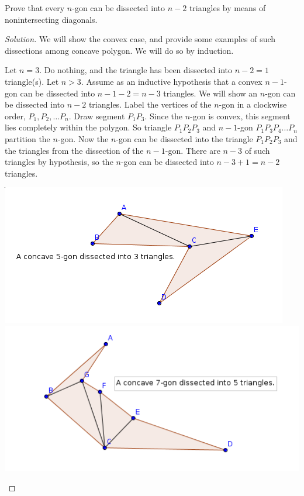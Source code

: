 \documentclass[12pt]{article}
\newenvironment{exercise}[2][Exercise]{\begin{trivlist}
        \item[\hskip \labelsep {\bfseries #1}\hskip \labelsep {\bfseries #2.}]}{\end{trivlist}}
\newenvironment{solution}
        {\begin{proof}[Solution]}
                    {\end{proof}}
\begin{document}
\begin{exercise}{44}
    Prove that every \( n \)-gon can be dissected into \( n-2 \) triangles by means of nonintersecting diagonals.
    \begin{solution}
        We will show the convex case, and provide some examples of such dissections among concave polygon. We will do so by induction.

        Let \( n = 3. \) Do nothing, and the triangle has been dissected into \( n-2 = 1 \) triangle(s). Let \( n > 3. \) Assume as an inductive hypothesis that a convex \( n-1 \)-gon can be dissected into \( n-1-2 = n-3 \) triangles. We will show an \( n \)-gon can be dissected into \( n-2 \) triangles. Label the vertices of the \( n \)-gon in a clockwise order, \( P_{1} , P_{2} , \dots P_{n} . \) Draw segment \( P_{1} P_{3} . \) Since the \( n \)-gon is convex, this segment lies completely within the polygon. So triangle \( P_{1} P_{2} P_{3} \) and \( n-1 \)-gon \( P_{1} P_{3} P_{4} \dots P_{n}  \) partition the \( n \)-gon. Now the \( n \)-gon can be dissected into the triangle \( P_{1} P_{2} P_{3} \) and the triangles from the dissection of the \( n-1 \)-gon. There are \( n-3 \) of such triangles by hypothesis, so the \( n \)-gon can be dissected into \( n-3+1 = n-2 \) triangles.

        \begin{center}
            \includegraphics[scale=.5]{44-1}
            \includegraphics[scale=.5]{44-2}
        \end{center}
    \end{solution}
\end{exercise}
\end{document}
